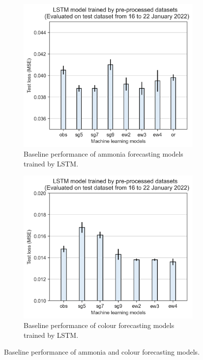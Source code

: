 \begin{figure}[h]
  \centering
  \begin{subfigure}[t]{0.45\textwidth}
    \includegraphics[width=\linewidth]{imgs/results/feature-engineering/pre-processing-nh3-jan.png}
    \caption{Baseline performance of ammonia forecasting models trained by LSTM.} \label{fig:preprocessing-nh3}
  \end{subfigure}
  \hspace{2em}
  \begin{subfigure}[t]{0.45\textwidth}
    \includegraphics[width=\linewidth]{imgs/results/feature-engineering/pre-processing-colour.png}
    \caption{Baseline performance of colour forecasting models trained by LSTM.} \label{fig:preprocessing-colour}
  \end{subfigure}
\caption{Baseline performance of ammonia and colour forecasting models.} \label{fig:preprocessing-comparison}
\end{figure}

